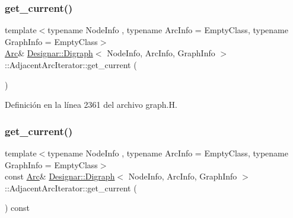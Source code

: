 \subsubsection{\texorpdfstring{get\+\_\+current()}{get\_current()}\hspace{0.1cm}{\footnotesize\ttfamily [1/2]}}
{\footnotesize\ttfamily template$<$typename Node\+Info , typename Arc\+Info  = Empty\+Class, typename Graph\+Info  = Empty\+Class$>$ \\
\hyperlink{class_designar_1_1_digraph_a0ceb278671f2a535c00fddccdeafd69f}{Arc}\& \hyperlink{class_designar_1_1_digraph}{Designar\+::\+Digraph}$<$ Node\+Info, Arc\+Info, Graph\+Info $>$\+::Adjacent\+Arc\+Iterator\+::get\+\_\+current (\begin{DoxyParamCaption}{ }\end{DoxyParamCaption})\hspace{0.3cm}{\ttfamily [inline]}}



Definición en la línea 2361 del archivo graph.\+H.

\mbox{\label{class_designar_1_1_digraph_1_1_adjacent_arc_iterator_ac388275a16db45fc754a193766c215ce}} 
\subsubsection{\texorpdfstring{get\+\_\+current()}{get\_current()}\hspace{0.1cm}{\footnotesize\ttfamily [2/2]}}
{\footnotesize\ttfamily template$<$typename Node\+Info , typename Arc\+Info  = Empty\+Class, typename Graph\+Info  = Empty\+Class$>$ \\
const \hyperlink{class_designar_1_1_digraph_a0ceb278671f2a535c00fddccdeafd69f}{Arc}\& \hyperlink{class_designar_1_1_digraph}{Designar\+::\+Digraph}$<$ Node\+Info, Arc\+Info, Graph\+Info $>$\+::Adjacent\+Arc\+Iterator\+::get\+\_\+current (\begin{DoxyParamCaption}{ }\end{DoxyParamCaption}) const\hspace{0.3cm}{\ttfamily [inline]}}



